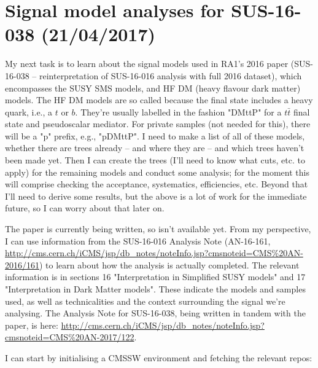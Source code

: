 \newpage
\chapter{Signal model analyses for SUS-16-038 (21/04/2017)}

My next task is to learn about the signal models used in RA1's 2016 paper (SUS-16-038 -- reinterpretation of SUS-16-016 analysis with full 2016 dataset), which encompasses the SUSY SMS models, and HF DM (heavy flavour dark matter) models. The HF DM models are so called because the final state includes a heavy quark, i.e., a $t$ or $b$. They're usually labelled in the fashion "DMttP" for a $t\bar{t}$ final state and pseudoscalar mediator. For private samples (not needed for this), there will be a "p" prefix, e.g., "pDMttP". I need to make a list of all of these models, whether there are trees already -- and where they are -- and which trees haven't been made yet. Then I can create the trees (I'll need to know what cuts, etc. to apply) for the remaining models and conduct some analysis; for the moment this will comprise checking the acceptance, systematics, efficiencies, etc. Beyond that I'll need to derive some results, but the above is a lot of work for the immediate future, so I can worry about that later on.

The paper is currently being written, so isn't available yet. From my perspective, I can use information from the SUS-16-016 Analysis Note (AN-16-161, \url{http://cms.cern.ch/iCMS/jsp/db_notes/noteInfo.jsp?cmsnoteid=CMS\%20AN-2016/161}) to learn about how the analysis is actually completed. The relevant information is in sections 16 "Interpretation in Simplified SUSY models" and 17 "Interpretation in Dark Matter models". These indicate the models and samples used, as well as technicalities and the context surrounding the signal we're analysing. The Analysis Note for SUS-16-038, being written in tandem with the paper, is here: \url{http://cms.cern.ch/iCMS/jsp/db_notes/noteInfo.jsp?cmsnoteid=CMS\%20AN-2017/122}. 

I can start by initialising a CMSSW environment and fetching the relevant repos:

